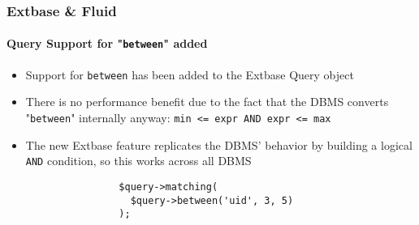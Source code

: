 
\begin{frame}[fragile]
	\frametitle{Extbase \& Fluid}
	\framesubtitle{Query Support for "\texttt{between}" added}

	\begin{itemize}

		\item Support for \texttt{between} has been added to the Extbase Query object

		\item There is no performance benefit due to the fact that the DBMS converts
			"\texttt{between}" internally anyway: \texttt{min <= expr AND expr <= max}

		\item The new Extbase feature replicates the DBMS' behavior by building a logical
			\texttt{AND} condition, so this works across all DBMS

			\begin{lstlisting}
				$query->matching(
				  $query->between('uid', 3, 5)
				);
			\end{lstlisting}

	\end{itemize}

\end{frame}


